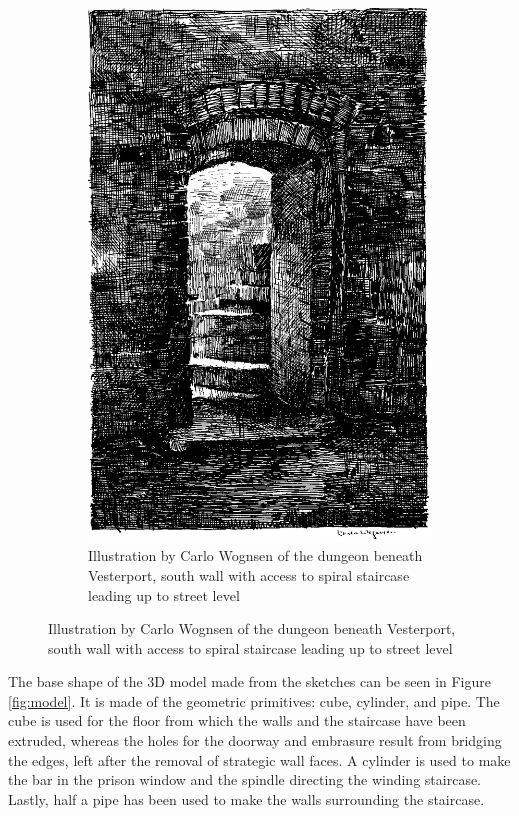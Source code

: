 \begin{figure}
\begin{subfigure}[h!]{0.4\textwidth}
        \includegraphics[width=\textwidth]{figures/sketch1.png}
        \caption{Illustration by Carlo Wognsen of the dungeon beneath Vesterport, south wall with access to spiral staircase leading up to street level \cite{Riismoller1961}}\label{fig:sketch1}
    \end{subfigure}
\end{figure}

The base shape of the 3D model made from the sketches can be seen in Figure \ref{fig:model}. It is made of the geometric primitives: cube, cylinder, and pipe. The cube is used for the floor from which the walls and the staircase have been extruded, whereas the holes for the doorway and embrasure result from bridging the edges, left after the removal of strategic wall faces. A cylinder is used to make the bar in the prison window and the spindle directing the winding staircase. Lastly, half a pipe has been used to make the walls surrounding the staircase.

